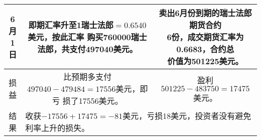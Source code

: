 \begin{enumerate}
\begin{center}
\begin{tabular}{c|c|c}
            \tabincell{c}{6月\\1日} & \tabincell{l}{即期汇率升至1瑞士法郎$=0.6540$美元，按此汇率\\购买760000瑞士法郎，共支付497040美元。} & \tabincell{l}{卖出6月份到期的瑞士法郎期货合约\\6份，成交期货汇率为0.6683，合约总\\价值为501225美元。} \\ \hline
            损益 & \tabincell{l}{比预期多支付$497040 - 479484 = 17556$美元，即亏\\损了17556美元。} & 盈利$501225 - 483750 = 17475$美元。 \\ \hline
            结果 & \multicolumn{2}{|l}{收获$-17556 + 17475 = -81$美元，亏损18美元，投资者没有避免利率上升的损失。} \\ \hline
        \end{tabular}
    \end{center}
\end{enumerate}
\clearpage